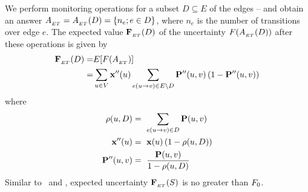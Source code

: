 
We perform monitoring operations for
a subset $D\subseteq E$ of the edges --
and obtain an answer 
$A_{_{\sc ET}} = A_{_{\sc ET}}(D) = \{n_e; e\in D\}$,
where $n_e$ is the number of transitions over edge $e$. 
The expected value $\mathbf{F}_{_{\sc ET}}(D)$ of the uncertainty 
$F(A_{_{\sc ET}}(D))$ 
after these operations is given by
\begin{align}
\mathbf{F}_{_{\sc ET}}(D) = & E[F(A_{_{\sc ET}})] \nonumber \\
= & \sum_{u\in V}\mathbf{x}^{\prime\prime}(u)\sum_{e(u\rightarrow v)\in E\setminus D}\mathbf{P}^{\prime\prime}(u,v)\left(1-\mathbf{P}^{\prime\prime}(u,v)\right) \label{eq:edgetransitions}
\end{align}
where 
\begin{align}
\rho(u,D) & =\ \sum_{e(u\rightarrow v)\in D}\transition(u,v) \nonumber\\
 \initial^{\prime\prime}(u) & =\ \initial(u)\left(1-\rho(u,D)\right) \label{eq:etinit}\\
 \transition^{\prime\prime}(u,v) & =\ \frac{\transition(u,v)}{1-\rho(u,D)} \label{eq:ettransit}
\end{align}
Similar to \parentstransitions\ and \nodeitems, expected uncertainty
$\mathbf{F}_{_{\sc ET}}(S)$ is no greater than
$\uncertainty_0$.

\iffalse
\spara{Expected uncertainty under \childrentransitions:}
Assume that we perform monitoring operations for
a subset $S\subseteq V$ of the nodes --
and obtain an answer
$A_{_\shortchildrentransitions}(S) 
= \{n_{uv}; u\in S, (u, v)\in E\}$, where $n_{uv}$ is the number of items that 
transition over edge $(u,v)$.
The expected value $\objective_{_\shortchildrentransitions}(S)$ of the uncertainty 
$\uncertainty(A_{_\shortchildrentransitions}(S))$ 
after these operations is given by
\begin{align}
\label{eq:shortchildrentransitions}
\objective_{_\shortchildrentransitions}(S) & = E[\uncertainty(A_{_\shortchildrentransitions})] = \nonumber \\
& = \sum_{u\in V-S}\initial(u)\sum_{v\in V}\transition(u,v)\left(1-\transition(u,v)\right).
\end{align}
Notice that this quantity is no greater than
$\uncertainty_0$ (Equation~\eqref{eq:uncertainty}), as the outer summation
is performed for a subset of nodes.
\fi

